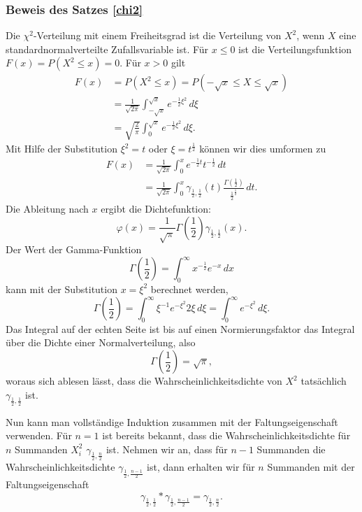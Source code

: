 {\subsubsection{Beweis des Satzes \ref{chi2}}
Die $\chi^2$-Verteilung mit einem Freiheitsgrad ist die Verteilung von
$X^2$, wenn $X$ eine standardnormalverteilte Zufallsvariable ist.
Für $x\le 0$ ist die Verteilungsfunktion $F(x)=P(X^2\le x)=0$. 
Für $x>0$ gilt
\begin{align*}
F(x)&=P(X^2\le x)=P(-\sqrt{x}\le X\le\sqrt{x})\\
&=\frac1{\sqrt{2\pi}}\int_{-\sqrt{x}}^{\sqrt{x}}e^{-\frac12 \xi^2}\,d\xi\\
&=\sqrt{\frac{2}{\pi}}\int_0^{\sqrt{x}}e^{-\frac12\xi^2}\,d\xi.
\end{align*}
Mit Hilfe der Substitution $\xi^2=t$ oder $\xi=t^{\frac12}$ können wir
dies umformen zu
\begin{align*}
F(x)&=\frac1{\sqrt{2\pi}}\int_0^xe^{-\frac12t}t^{-\frac12}\,dt\\
&=\frac1{\sqrt{2\pi}}\int_0^x\gamma_{\frac12,\frac12}(t)
\frac{\Gamma(\frac12)}{{\frac12}^{\frac12}}\,dt.
\end{align*}
Die Ableitung nach $x$ ergibt die Dichtefunktion:
\[
\varphi(x)
=
\frac1{\sqrt{\pi}}\Gamma({\textstyle\frac12})\gamma_{\frac12,\frac12}(x).
\]
Der Wert der Gamma-Funktion
\[
\Gamma({\textstyle\frac12})
=\int_0^\infty x^{-\frac12}e^{-x}\,dx
\]
kann mit der Substitution $x=\xi^2$ berechnet werden,
\[
\Gamma({\textstyle\frac12})=\int_0^\infty \xi^{-1}e^{-\xi^2}2\xi\,d\xi
=\int_0^{\infty}e^{-\xi^2}\,d\xi.
\]
Das Integral auf der echten Seite ist bis auf einen Normierungsfaktor
das Integral über die Dichte einer Normalverteilung, also
\[
\Gamma({\textstyle\frac12})=\sqrt{\pi},
\]
woraus sich ablesen lässt, dass die Wahrscheinlichkeitsdichte 
von $X^2$ tatsächlich $\gamma_{\frac12,\frac12}$ ist.

Nun kann man vollständige Induktion zusammen mit der Faltungseigenschaft
verwenden.
Für $n=1$ ist bereits bekannt, dass die Wahrscheinlichkeitsdichte
für $n$ Summanden $X_i^2$ $\gamma_{\frac12,\frac{n}2}$ ist.
Nehmen wir an,
dass für $n-1$ Summanden die Wahrscheinlichkeitsdichte
$\gamma_{\frac12,\frac{n-1}2}$
ist, dann erhalten wir für $n$ Summanden mit der Faltungseigenschaft
\[
\gamma_{\frac12,\frac12}*\gamma_{\frac12,\frac{n-1}2}
=
\gamma_{\frac12,\frac{n}2}.
\]

}
